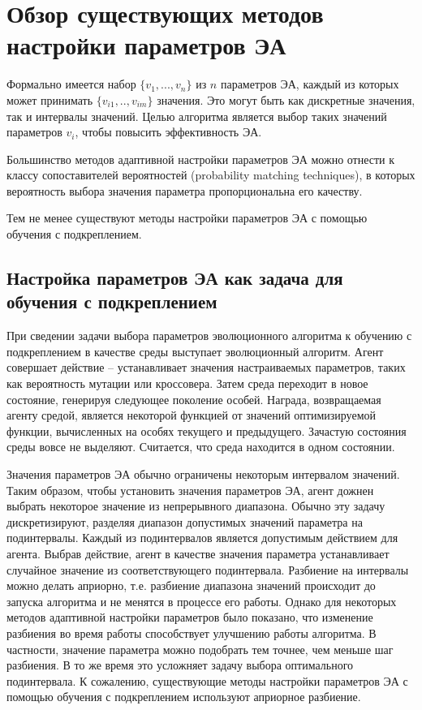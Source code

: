 \section{Обзор существующих методов настройки параметров ЭА}

Формально имеется набор $\{v_1, ..., v_n\}$ из $n$ параметров ЭА, каждый из которых может принимать $\{v_{i1}, .., v_{im}\}$ значения. Это могут быть как дискретные значения, так и интервалы значений. Целью алгоритма является выбор таких значений параметров $v_i$, чтобы повысить эффективность ЭА.

Большинство методов адаптивной настройки параметров ЭА можно отнести к классу сопоставителей вероятностей (probability matching techniques), в которых вероятность выбора значения параметра пропорциональна его качеству.

Тем не менее существуют методы настройки параметров ЭА с помощью обучения с подкреплением. 

\subsection{Настройка параметров ЭА как задача для обучения с подкреплением}

При сведении задачи выбора параметров эволюционного алгоритма к обучению с подкреплением в качестве среды выступает эволюционный алгоритм. Агент совершает действие -- устанавливает значения настраиваемых параметров, таких как вероятность мутации или кроссовера. Затем среда переходит в новое состояние, генерируя следующее поколение особей. Награда, возвращаемая агенту средой, является некоторой функцией от значений оптимизируемой функции, вычисленных на особях текущего и предыдущего. Зачастую состояния среды вовсе не выделяют. Считается, что среда находится в одном состоянии.

Значения параметров ЭА обычно ограничены некоторым интервалом значений. Таким образом, чтобы установить значения параметров ЭА, агент дожнен выбрать некоторое значение из непрерывного диапазона. Обычно эту задачу дискретизируют, разделяя диапазон допустимых значений параметра на подинтервалы. Каждый из подинтервалов является допустимым действием для агента. Выбрав действие, агент в качестве значения параметра устанавливает случайное значение из соответствующего подинтервала. Разбиение на интервалы можно делать априорно, т.е. разбиение диапазона значений происходит до запуска алгоритма и не менятся в процессе его работы. Однако для некоторых методов адаптивной настройки параметров было показано, что изменение разбиения во время работы способствует улучшению работы алгоритма. В частности, значение параметра можно подобрать тем точнее, чем меньше шаг разбиения. В то же время это усложняет задачу выбора оптимального подинтервала. К сожалению,  существующие методы настройки параметров ЭА с помощью обучения с подкреплением используют априорное разбиение.

